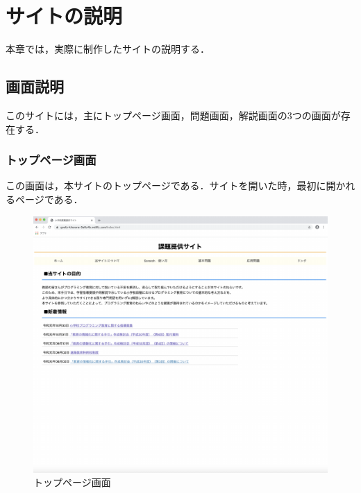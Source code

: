 \newpage

\section{\rm サイトの説明}
本章では，実際に制作したサイトの説明する．
\subsection{画面説明}
このサイトには，主にトップページ画面，問題画面，解説画面の3つの画面が存在する．

\subsubsection{トップページ画面}
この画面は，本サイトのトップページである．サイトを開いた時，最初に開かれるページである．

\begin{figure}[h]
\begin{center}
\includegraphics[width=15cm]{toppage.pdf}
\caption{トップページ画面}
\label{fig:houhou}
\end{center}
\end{figure}

\newpage
